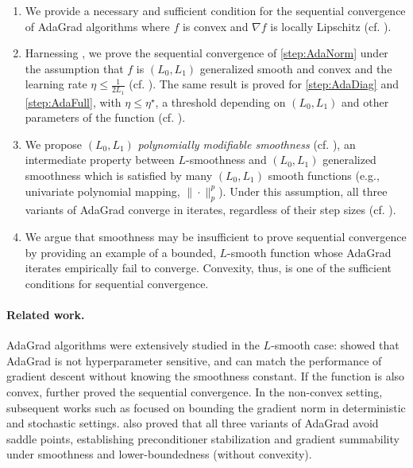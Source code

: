 \documentclass{article}
\theoremstyle{plain}
\theoremstyle{definition}
\theoremstyle{remark}
\begin{document}
\begin{enumerate}[leftmargin=*]
    \item We provide a necessary and sufficient condition for the sequential convergence of AdaGrad algorithms where $f$ is convex and $\nabla f$ is locally Lipschitz (cf. ).
    \item Harnessing , we prove the sequential convergence of \ref{step:AdaNorm} under the assumption that $f$ is $(L_0, L_1)$ generalized smooth and convex and the learning rate $\eta \leq \frac{1}{2L_1}$ (cf. ). The same result is proved for \ref{step:AdaDiag} and \ref{step:AdaFull}, with $\eta \leq \eta^\star$, a threshold depending on $(L_0, L_1)$ and other parameters of the function (cf. ).   
    \item We propose $(L_0,L_1)$ \emph{polynomially modifiable smoothness} (cf. ), an intermediate property between $L$-smoothness and $(L_0,L_1)$ generalized smoothness which is satisfied by many $(L_0,L_1)$ smooth functions (e.g., univariate polynomial mapping, $\|\cdot\|_p^p$). Under this assumption, all three variants of AdaGrad converge in iterates, regardless of their step sizes (cf. ).
    \item We argue that smoothness may be insufficient to prove sequential convergence by providing an example of a bounded, $L$-smooth function whose AdaGrad iterates empirically fail to converge. Convexity, thus, is one of the sufficient conditions for sequential convergence.
\end{enumerate}

\paragraph{Related work.}
AdaGrad algorithms were extensively studied in the $L$-smooth case: \citet{rachel2019ada} showed that AdaGrad is not hyperparameter sensitive, and can match the performance of gradient descent without knowing the smoothness constant. If the function is also convex, \citet{traore2021sequential} further proved the sequential convergence. In the non-convex setting, subsequent works such as \citet{defossez2022a,zhou2024adagrad,kavis2022high,liu2023highprobability} focused on bounding the gradient norm in deterministic and stochastic settings. \citet{antonakopoulos2022adagrad} also proved that all three variants
of AdaGrad avoid saddle points, establishing preconditioner
stabilization and gradient summability under smoothness and
lower-boundedness (without convexity).
\end{document}
